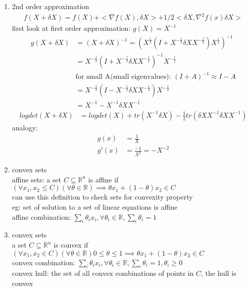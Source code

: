 \documentclass[12pt,letter]{article}
\newcommand{\R}{\mathbb{R}}
\begin{document}
\begin{enumerate}
\item 2nd order approximation
  \begin{align*}
    f(X+\delta X) = f(X) + <\nabla f(X), \delta X>  + 1/2 <\delta X, \nabla^2 f(x) \delta X>
  \end{align*}
  first look at first order approximation: $g(X) = X^{-1}$
  \begin{align*}
    g(X+\delta X) &= (X+\delta X)^{-1} = (X^{\frac{1}{2}}(I+X^{-\frac{1}{2}} \delta X X^{-\frac{1}{2}}) X^{\frac{1}{2}})^{-1}\\
                  &= X^{-\frac{1}{2}}(I+X^{-\frac{1}{2}} \delta X X^{-\frac{1}{2}})^{-1} X^{-\frac{1}{2}}\\
                  &\text{for small A(small eigenvalues): } (I+A)^{-1} \approx I-A\\
                  &= X^{-\frac{1}{2}}(I-X^{-\frac{1}{2}} \delta X X^{-\frac{1}{2}}) X^{-\frac{1}{2}}\\
                  &= X^{-1} - X^{-1} \delta X X^{-1}
  \end{align*}
  \begin{align*}
    logdet(X+\delta X)&=logdet(X)+tr(X^{-1}\delta X) - \frac{1}{2} tr(\delta X X^{-1} \delta X X^{-1})
  \end{align*}
  analogy:
  \begin{align*}
    g(x)&=\frac{1}{X}\\
    g'(x)&=\frac{-1}{X^2} = -X^{-2}
  \end{align*}
\item convex sets\\
  affine sets: a set $C \subseteq \R^n$ is affine if $(\forall x_1, x_2 \leq C)(\forall \theta \in \R) \implies \theta x_1 +(1-\theta) x_2 \in C$\\
  can use this definition to check sets for convexity property\\
  eg: set of solution to a set of linear equations is affine\\
  affine combination: $\sum_i \theta_i x_i, \forall \theta_i \in \R, \sum_i \theta_i = 1$\\
\item convex sets\\
  a set $C \subseteq \R^n$ is convex if $(\forall x_1,x_2 \in C)(\forall \theta \in \R) 0 \leq \theta \leq 1 \implies \theta x_1 +(1-\theta)x_2 \in C$\\
  convex combination: $\sum_i \theta_i x_i, \forall \theta_i \in \R, \sum_i \theta_i = 1, \theta_i \geq 0$\\
  convex hull: the set of all convex combinations of points in $C$, the hull is convex\\

\end{enumerate}
\end{document}
